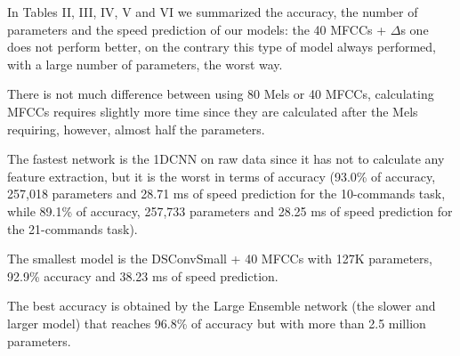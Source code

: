 \documentclass[conference]{IEEEtran}
\begin{document}
In Tables II, III, IV, V and VI we summarized the accuracy, the number of parameters and the speed prediction of our models: the 40 MFCCs + $\Delta$s one does not perform better, on the contrary this type of model always performed, with a large number of parameters, the worst way.

There is not much difference between using 80 Mels or 40 MFCCs, calculating MFCCs requires slightly more time since they are calculated after the Mels requiring, however, almost half the parameters.

The fastest network is the 1DCNN on raw data since it has not to calculate any feature extraction, but it is the worst in terms of accuracy (93.0\% of accuracy, 257,018 parameters and 28.71 ms of speed prediction for the 10-commands task, while 89.1\% of accuracy, 257,733 parameters and 28.25 ms of speed prediction for the 21-commands task).

The smallest model is the DSConvSmall + 40 MFCCs with 127K parameters, 92.9\% accuracy and 38.23 ms of speed prediction.

The best accuracy is obtained by the Large Ensemble network (the slower and larger model) that reaches 96.8\% of accuracy but with more than 2.5 million parameters.

\begin{center}
\begin{table}[]
\begin{center}
\caption{1DCNN performances on 10 and 21-commands datasets.}
\end{center}
\end{table}
\end{center}
\end{document}
